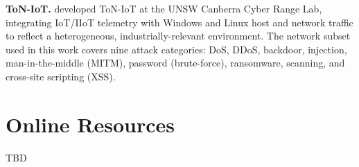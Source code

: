 \documentclass[sigconf]{acmart}
\begin{document}
\textbf{ToN-IoT.} \citep{moustafa_toniot_2021} developed ToN-IoT at the UNSW Canberra Cyber Range Lab, integrating IoT/IIoT telemetry with Windows and Linux host and network traffic to reflect a heterogeneous, industrially-relevant environment. The network subset used in this work covers nine attack categories: DoS, DDoS, backdoor, injection, man-in-the-middle (MITM), password (brute-force), ransomware, scanning, and cross-site scripting (XSS).

\section{Online Resources}
TBD
\end{document}
